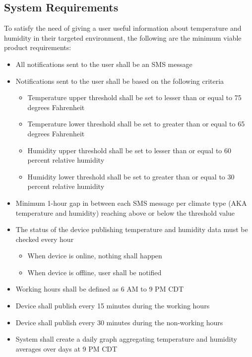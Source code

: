 \documentclass{article}
\begin{document}
\subsection{System Requirements}
To satisfy the need of giving a user useful information about temperature and humidity in their targeted environment, the following are the minimum viable product requirements:

\begin{itemize}
	\item All notifications sent to the user shall be an SMS message
	\item Notifications sent to the user shall be based on the following criteria
	      \begin{itemize}
		      \item Temperature upper threshold shall be set to lesser than or equal to 75 degrees Fahrenheit
		      \item Temperature lower threshold shall be set to greater than or equal to 65 degrees Fahrenheit
		      \item Humidity upper threshold shall be set to lesser than or equal to 60 percent relative humidity
		      \item Humidity lower threshold shall be set to greater than or equal to 30 percent relative humidity
	      \end{itemize}
	\item Minimum 1-hour gap in between each SMS message per climate type (AKA temperature and humidity) reaching above or below the threshold value
	\item The status of the device publishing temperature and humidity data must be checked every hour
	      \begin{itemize}
		      \item When device is online, nothing shall happen
		      \item When device is offline, user shall be notified
	      \end{itemize}
    \item Working hours shall be defined as 6 AM to 9 PM CDT
    \item Device shall publish every 15 minutes during the working hours
    \item Device shall publish every 30 minutes during the non-working hours
    \item System shall create a daily graph aggregating temperature and humidity averages over days at 9 PM CDT
\end{itemize}
\end{document}
